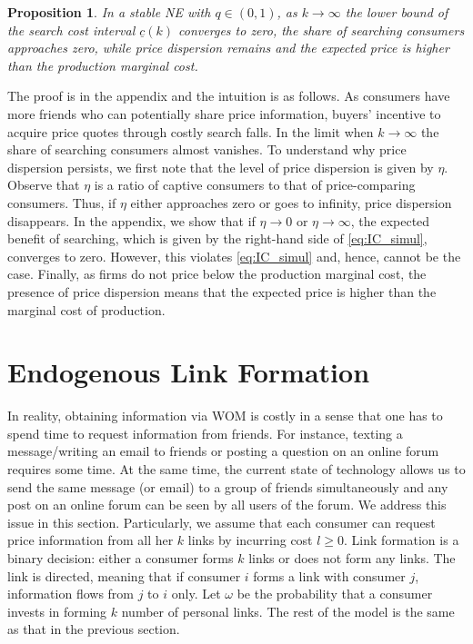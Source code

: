 \documentclass[12pt]{article}
\newtheorem{proposition}{Proposition}
\begin{document}
\begin{proposition}\label{prop:simul}
	In a stable NE with $q \in (0,1)$, as $k\to \infty$ the 
	lower bound of the search cost interval $\underline{c}(k)$ 
	converges to zero, the share of searching consumers 
	approaches zero, while price dispersion remains and
	the expected price is higher than the production marginal cost.
\end{proposition}

The proof is in the appendix and the intuition is as follows.  
As consumers have more friends who can potentially share price 
information, buyers' incentive to acquire price quotes through 
costly search falls.  In the limit when $k\to \infty$ the share 
of searching consumers almost vanishes.  To understand why price 
dispersion persists, we first note that the level of price 
dispersion is given by $\eta$.  Observe that $\eta$ is a 
ratio of captive consumers to that of price-comparing 
consumers.  Thus, if $\eta$ either approaches zero or goes to 
infinity, price dispersion disappears.  In the appendix, we show 
that if $\eta \to 0$ or $\eta \to \infty$, the expected benefit 
of searching, which is given by the right-hand side of 
\eqref{eq:IC_simul}, converges to zero.  However, this violates 
\eqref{eq:IC_simul} and, hence, cannot be the case.  Finally, as 
firms do not price below the production marginal cost, the 
presence of price dispersion means that the expected price is 
higher than the marginal cost of production. 






\section{Endogenous Link Formation}\label{s:link_form}

In reality, obtaining information via WOM is costly in a sense 
that one has to spend time to request information from friends.  
For instance, texting a message/writing an email to friends or 
posting a question on an online forum requires some time.  At 
the same time, the current state of technology allows us to send 
the same message (or email) to a group of friends simultaneously 
and any post on an online forum can be seen by all users of the 
forum.  We address this issue in 
this section.  Particularly, we assume that each consumer can 
request price information from all her $k$ links by incurring 
cost $l\geq 0$.  Link formation is a binary decision: either a 
consumer forms $k$ links or does not form any links.  The link 
is directed, meaning that if consumer $i$ forms a link with 
consumer $j$, information flows from $j$ to $i$ only.  Let 
$\omega$ be the probability that a consumer invests in forming 
$k$ number of personal links. The rest of the model is the same 
as that in the previous section.  
\end{document}
